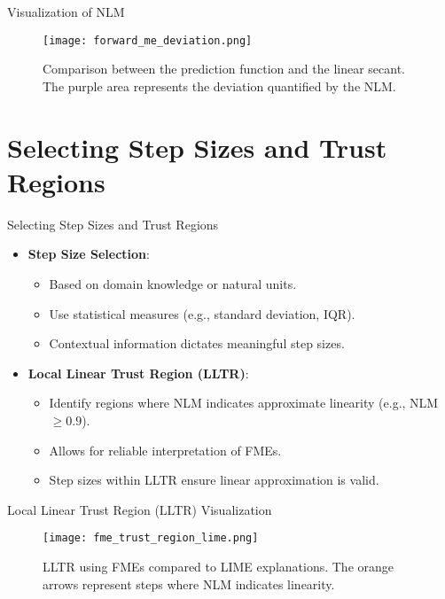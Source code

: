 \documentclass[11pt,compress,t,notes=noshow, aspectratio=169, xcolor=table]{beamer}
\begin{document}
\begin{frame}{Visualization of NLM}
\begin{figure}
  \centering
  \texttt{[image: forward\_me\_deviation.png]}
  \caption{Comparison between the prediction function and the linear secant. The purple area represents the deviation quantified by the NLM.}
\end{figure}
\end{frame}

\section{Selecting Step Sizes and Trust Regions}

\begin{frame}{Selecting Step Sizes and Trust Regions}
\begin{itemize}
\item \textbf{Step Size Selection}:
\begin{itemize}
  \item Based on domain knowledge or natural units.
  \item Use statistical measures (e.g., standard deviation, IQR).
  \item Contextual information dictates meaningful step sizes.
\end{itemize}
\item \textbf{Local Linear Trust Region (LLTR)}:
\begin{itemize}
  \item Identify regions where NLM indicates approximate linearity (e.g., NLM $\geq 0.9$).
  \item Allows for reliable interpretation of FMEs.
  \item Step sizes within LLTR ensure linear approximation is valid.
\end{itemize}
\end{itemize}
\end{frame}

\begin{frame}{Local Linear Trust Region (LLTR) Visualization}
\begin{figure}
  \centering
  \texttt{[image: fme\_trust\_region\_lime.png]}
  \caption{LLTR using FMEs compared to LIME explanations. The orange arrows represent steps where NLM indicates linearity.}
\end{figure}
\end{frame}
\end{document}

